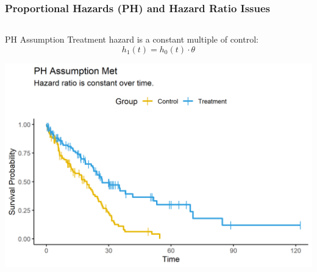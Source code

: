 \documentclass{beamer}
\begin{document}
\begin{frame}
\frametitle{Proportional Hazards (PH) and Hazard Ratio Issues}

\begin{columns}[T,onlytextwidth]
  \begin{column}{0.48\textwidth}
    \begin{block}{PH Assumption}
      Treatment hazard is a constant multiple of control:
      \[
        h_1(t) = h_0(t)\cdot \theta
      \]
    \end{block}

    \centering
    \includegraphics[width=\linewidth,height = 0.9\linewidth]{images/ph_assumption_met.png} 
  \end{column}

  \hspace{0.04\textwidth}


\end{columns}
\end{frame}
\end{document}
